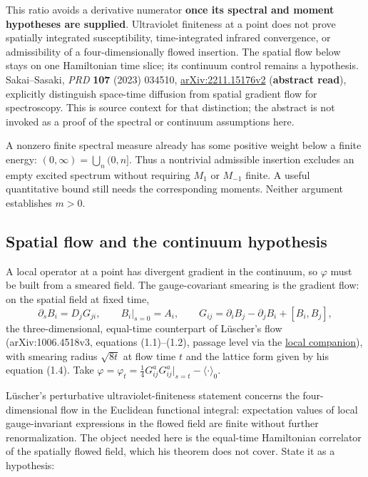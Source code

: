 \documentclass[11pt,a4paper]{article}
\begin{document}
This ratio avoids a derivative numerator \textbf{once its spectral and
moment hypotheses are supplied}. Ultraviolet finiteness at a point does
not prove spatially integrated susceptibility, time-integrated infrared
convergence, or admissibility of a four-dimensionally flowed insertion.
The spatial flow below stays on one Hamiltonian time slice; its
continuum control remains a hypothesis. Sakai--Sasaki, \emph{PRD}
\textbf{107} (2023) 034510,
\href{https://arxiv.org/abs/2211.15176v2}{arXiv:2211.15176v2}
(\textbf{abstract read}), explicitly distinguish space-time diffusion
from spatial gradient flow for spectroscopy. This is source context for
that distinction; the abstract is not invoked as a proof of the spectral
or continuum assumptions here.

A nonzero finite spectral measure already has some positive weight below
a finite energy: \((0,\infty)=\bigcup_n(0,n]\). Thus a nontrivial
admissible insertion excludes an empty excited spectrum without
requiring \(M_1\) or \(M_{-1}\) finite. A useful quantitative bound
still needs the corresponding moments. Neither argument establishes
\(m>0\).

\hypertarget{spatial-flow-and-the-continuum-hypothesis}{%
\subsection{Spatial flow and the continuum
hypothesis}\label{spatial-flow-and-the-continuum-hypothesis}}

A local operator at a point has divergent gradient in the continuum, so
\(\varphi\) must be built from a smeared field. The gauge-covariant
smearing is the gradient flow: on the spatial field at fixed time,
\[\partial_s B_i=D_jG_{ji},\qquad B_i|_{s=0}=A_i,\qquad
G_{ij}=\partial_iB_j-\partial_jB_i+[B_i,B_j],\] the three-dimensional,
equal-time counterpart of Lüscher's flow (arXiv:1006.4518v3, equations
(1.1)--(1.2), passage level via the
\href{../docs/Luscher_WilsonFlow_1006.4518v3.md}{local companion}), with
smearing radius \(\sqrt{8t}\) at flow time \(t\) and the lattice form
given by his equation (1.4). Take
\(\varphi=\varphi_t=\tfrac14G^a_{ij}G^a_{ij}\big|_{s=t}-\langle\cdot\rangle_0\).

Lüscher's perturbative ultraviolet-finiteness statement concerns the
four-dimensional flow in the Euclidean functional integral: expectation
values of local gauge-invariant expressions in the flowed field are
finite without further renormalization. The object needed here is the
equal-time Hamiltonian correlator of the spatially flowed field, which
his theorem does not cover. State it as a hypothesis:
\end{document}
